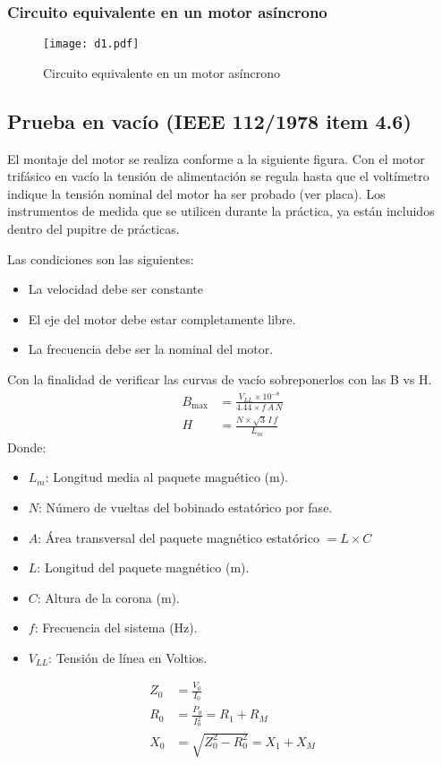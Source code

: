 \documentclass[a4paper,11pt]{article}
\begin{document}
\subsubsection{Circuito equivalente en un motor asíncrono}
    \begin{figure}[H]
        \centering
        \texttt{[image: d1.pdf]}
        \caption{Circuito equivalente en un motor asíncrono}
    \end{figure}
\subsection[Prueba en vacío IEEE 112/1978]{Prueba en vacío (IEEE 112/1978 item 4.6)}
El montaje del motor se realiza conforme a la siguiente figura. Con el motor trifásico en vacío la tensión de alimentación se regula hasta que el voltímetro indique la tensión nominal del motor ha ser probado (ver placa). Los instrumentos de medida que se utilicen durante la práctica, ya están incluidos dentro del pupitre de prácticas.

Las condiciones son las siguientes:
\begin{itemize}
    \item La velocidad debe ser constante
    \item El eje del motor debe estar completamente libre.
    \item La frecuencia debe ser la nominal del motor.
\end{itemize}
Con la finalidad de verificar las curvas de vacío sobreponerlos con las B vs H.
\begin{align}
    B_{\max} &= \frac{V_{LL}\times 10^{-8}}{4.44\times f\, A\, N}\\
    H &= \frac{N\times \sqrt{3}\, I \, f}{L_{m}}
\end{align}
Donde:
\begin{itemize}
    \item $L_{m}$: Longitud media al paquete magnético (m).
    \item $N$: Número de vueltas del bobinado estatórico por fase.
    \item $A$: Área transversal del paquete magnético estatórico $= L\times C$
    \item $L$: Longitud del paquete magnético (m).
    \item $C$: Altura de la corona (m).
    \item $f$: Frecuencia del sistema (Hz).
    \item $V_{LL}$: Tensión de línea en Voltios.
\end{itemize}
\begin{align}
    Z_{0} &= \frac{V_{0}}{I_{0}}\\
    R_{0} &= \frac{P_{0}}{I^{2}_{0}} = R_{1} + R_{M}\\
    X_{0} &= \sqrt{Z^{2}_{0} - R^{2}_{0}} = X_{1} + X_{M}
\end{align}
\end{document}
